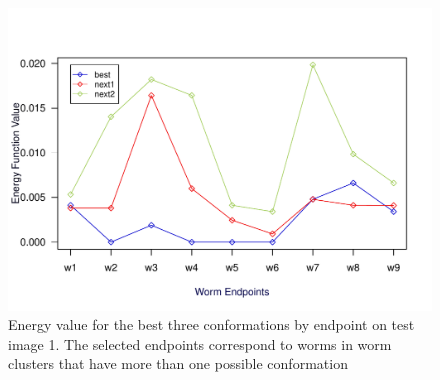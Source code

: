 \begin{figure}[h t b p ! H]
 \centering
   \includegraphics[scale=0.9]{results/test1/energy-graph}
 \caption{Energy value for the best three conformations by endpoint on test
image 1. The selected endpoints correspond to worms in worm clusters that
have more than one possible conformation}
\end{figure}